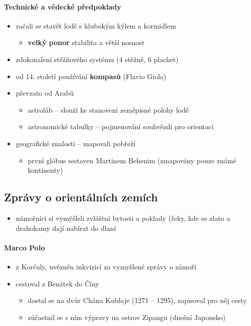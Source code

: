 \paragraph{Technické a vědecké předpoklady}
\begin{itemize}
\item začali se stavět lodě s hlubokým kýlem a kormidlem
	\begin{itemize}
	\item \textbf{velký ponor} \ra stabilita a větší nosnost
	\end{itemize}
\item zdokonalení stěžňového systému (4 stěžně, 6 plachet)
\item od 14. století používání \textbf{kompasů} (Flavio Giola)
\item převzato od Arabů
	\begin{itemize}
	\item astroláb -- slouží ke stanovení zeměpisné polohy lodě 
	\item astronomické tabulky -- pojmenování souhvězdí pro orientaci 
	\end{itemize}
\item geografické znalosti -- mapovali pobřeží
	\begin{itemize}
	\item první glóbus sestaven Martinem Behenim (zmapovány pouze známé kontinenty)
	\end{itemize}
\end{itemize}

\subsection{Zprávy o orientálních zemích}
\begin{itemize}
\item námořníci si vymýšleli zvláštní bytosti a poklady (řeky, kde se zlato a drahokamy dají nabírat do dlaní
\end{itemize}

\paragraph{Marco Polo}
\begin{itemize}
\item z Korčuly, uvězněn inkvizicí za vymyšlené zprávy o zámoří
\item cestoval z Benátek do Číny
	\begin{itemize}
	\item dostal se na dvůr Chána Kublaje (1271 -- 1295), zapisoval pro něj cesty
	\item zúčastnil se s ním výpravy na ostrov Zipangu (dnešní Japonsko)
	\end{itemize}
\end{itemize}

